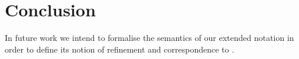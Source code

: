 \section{Conclusion}
\label{sec:conc}


In future work we intend to formalise the
semantics of our extended \SCXML notation in order to define its
notion of refinement and correspondence to \EventB.

